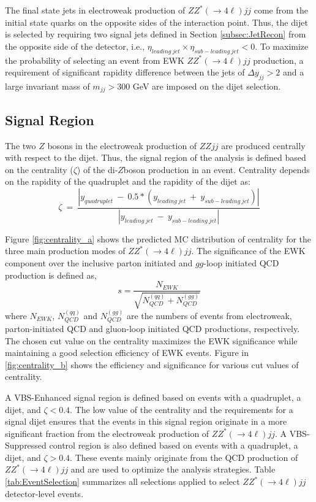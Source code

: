 The final state jets in electroweak production of $ZZ^*(\rightarrow 4\ell) jj$ come from the initial state quarks on the opposite sides of the interaction point. Thus, the dijet is selected by requiring two signal jets defined in Section \ref{subsec:JetRecon} from the opposite side of the detector, i.e., $\eta_{leading~jet} \times \eta_{sub-leading~jet} < 0$. To maximize the probability of selecting an event from EWK $ZZ^*(\rightarrow 4\ell)jj$ production, a requirement of significant rapidity difference between the jets of $\Delta y_{jj}> 2 $ and a large invariant mass of $m_{jj} > 300 $ GeV are imposed on the dijet selection. 

\subsection{Signal Region}
\label{subsec:SignalRegion}
The two $Z$ bosons in the electroweak production of $ZZjj$ are produced centrally with respect to the dijet. Thus, the signal region of the analysis is defined based on the centrality ($\zeta$) of the di-$Z$boson production in an event. Centrality depends on the rapidity of the quadruplet and the rapidity of the dijet as:
\begin{equation}
    \zeta~=~\frac{|y_{quadruplet}~-~ 0.5*(y_{leading~jet}~+~y_{sub-leading~jet})| }{|y_{leading~jet}~-~y_{sub-leading~jet}|}
    \label{eq:centr}
\end{equation}

Figure \ref{fig:centrality_a} shows the predicted MC distribution of centrality for the three main production modes of $ZZ^*(\rightarrow 4 \ell)jj$. The significance of the EWK component over the inclusive parton initiated and $gg$-loop initiated QCD production is defined as, 
\begin{equation}
    s=\frac{N_{EWK}}{\sqrt{N_{QCD}^{(qq)}+N_{QCD}^{(gg)}}}
    \label{eqn:EWKSignificance}
\end{equation}
where $N_{EWK}$, $N_{QCD}^{(qq)}$ and $N_{QCD}^{(gg)}$ are the numbers of events from electroweak, parton-initiated QCD and gluon-loop initiated QCD productions, respectively. The chosen cut value on the centrality maximizes the EWK significance while maintaining a good selection efficiency of EWK events. Figure in \ref{fig:centrality_b} shows the efficiency and significance for various cut values of centrality.  

A VBS-Enhanced signal region is defined based on events with a quadruplet, a dijet, and $\zeta<0.4$. The low value of the centrality and the requirements for a signal dijet ensures that the events in this signal region originate in a more significant fraction from the electroweak production of $ZZ^*(\rightarrow 4 \ell) jj$. A VBS-Suppressed control region is also defined based on events with a quadruplet, a dijet, and $\zeta>0.4$. These events mainly originate from the QCD production of $ZZ^*(\rightarrow 4 \ell) jj$ and are used to optimize the analysis strategies. Table \ref{tab:EventSelection} summarizes all selections applied to select $ZZ^*(\rightarrow 4\ell)jj$ detector-level events.

